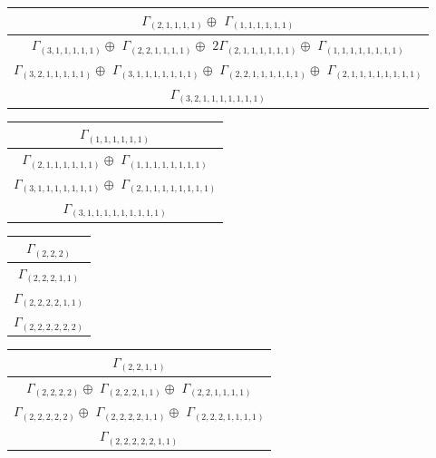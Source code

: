 \documentclass[main.tex]{subfiles}
\begin{document}
\bigskip
\begin{minipage}{.6\textwidth}
\centering
\begin{tabular}{c}
$\Gamma_{(
2 , 
1 , 
1 , 
1 , 
1
)} \oplus$
$\Gamma_{(
1 , 
1 , 
1 , 
1 , 
1 , 
1
)}$
\\ \hline
$\Gamma_{(
3 , 
1 , 
1 , 
1 , 
1 , 
1
)} \oplus$
$\Gamma_{(
2 , 
2 , 
1 , 
1 , 
1 , 
1
)} \oplus$
$ 2 \Gamma_{(
2 , 
1 , 
1 , 
1 , 
1 , 
1 , 
1
)} \oplus$
$\Gamma_{(
1 , 
1 , 
1 , 
1 , 
1 , 
1 , 
1 , 
1
)}$
\\ \hline
$\Gamma_{(
3 , 
2 , 
1 , 
1 , 
1 , 
1 , 
1
)} \oplus$
$\Gamma_{(
3 , 
1 , 
1 , 
1 , 
1 , 
1 , 
1 , 
1
)} \oplus$
$\Gamma_{(
2 , 
2 , 
1 , 
1 , 
1 , 
1 , 
1 , 
1
)} \oplus$
$\Gamma_{(
2 , 
1 , 
1 , 
1 , 
1 , 
1 , 
1 , 
1 , 
1
)}$
\\ \hline
$\Gamma_{(
3 , 
2 , 
1 , 
1 , 
1 , 
1 , 
1 , 
1 , 
1
)}$
\\
\end{tabular}\end{minipage}
\begin{minipage}{.4\textwidth}
\centering
\begin{tabular}{c}
$\Gamma_{(
1 , 
1 , 
1 , 
1 , 
1 , 
1
)}$
\\ \hline
$\Gamma_{(
2 , 
1 , 
1 , 
1 , 
1 , 
1 , 
1
)} \oplus$
$\Gamma_{(
1 , 
1 , 
1 , 
1 , 
1 , 
1 , 
1 , 
1
)}$
\\ \hline
$\Gamma_{(
3 , 
1 , 
1 , 
1 , 
1 , 
1 , 
1 , 
1
)} \oplus$
$\Gamma_{(
2 , 
1 , 
1 , 
1 , 
1 , 
1 , 
1 , 
1 , 
1
)}$
\\ \hline
$\Gamma_{(
3 , 
1 , 
1 , 
1 , 
1 , 
1 , 
1 , 
1 , 
1 , 
1
)}$
\\
\end{tabular}\end{minipage}
\bigskip
\begin{minipage}{.2\textwidth}
\centering
\begin{tabular}{c}
$\Gamma_{(
2 , 
2 , 
2
)}$
\\ \hline
$\Gamma_{(
2 , 
2 , 
2 , 
1 , 
1
)}$
\\ \hline
$\Gamma_{(
2 , 
2 , 
2 , 
2 , 
1 , 
1
)}$
\\ \hline
$\Gamma_{(
2 , 
2 , 
2 , 
2 , 
2 , 
2
)}$
\\
\end{tabular}\end{minipage}
\begin{minipage}{.4\textwidth}
\centering
\begin{tabular}{c}
$\Gamma_{(
2 , 
2 , 
1 , 
1
)}$
\\ \hline
$\Gamma_{(
2 , 
2 , 
2 , 
2
)} \oplus$
$\Gamma_{(
2 , 
2 , 
2 , 
1 , 
1
)} \oplus$
$\Gamma_{(
2 , 
2 , 
1 , 
1 , 
1 , 
1
)}$
\\ \hline
$\Gamma_{(
2 , 
2 , 
2 , 
2 , 
2
)} \oplus$
$\Gamma_{(
2 , 
2 , 
2 , 
2 , 
1 , 
1
)} \oplus$
$\Gamma_{(
2 , 
2 , 
2 , 
1 , 
1 , 
1 , 
1
)}$
\\ \hline
$\Gamma_{(
2 , 
2 , 
2 , 
2 , 
2 , 
1 , 
1
)}$
\\
\end{tabular}\end{minipage}
\end{document}
